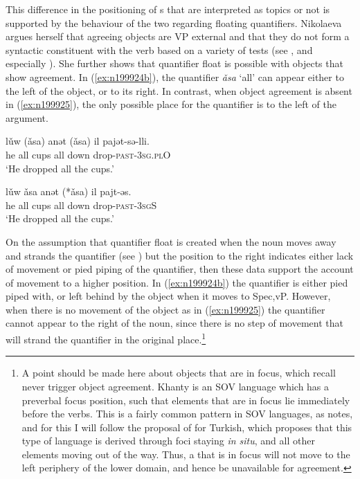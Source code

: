 \documentclass[output=paper
,modfonts
,nonflat]{langsci/langscibook}
\begin{document}
\noindent This difference in the positioning of \theme s that are interpreted as topics or not is supported by the behaviour of the two regarding floating quantifiers. Nikolaeva argues herself that agreeing objects are VP external and that they do not form a syntactic constituent with the verb based on a variety of tests (see \citealt{nikolaeva1999}, and especially \citealt[][67-69]{ostyakgrammar}). She further shows that quantifier float is possible with objects that show agreement. 
In (\ref{ex:n199924b}), the quantifier \emph{\v{a}sa} `all' can appear either to the left of the object, or to its right. In contrast, when object agreement is absent in (\ref{ex:n199925}), the only possible place for the quantifier is to the left of the argument.
\begin{exe}
\ex \citet[][345]{nikolaeva1999}
\begin{xlist}
\ex 
{\gll l\v{u}w (\v{a}sa) anət (\v{a}sa) il pajət-sə-lli.\\
he all cups all down drop-\textsc{past-3sg.plO}\\
\glt `He dropped all the cups.'} \label{ex:n199924b}

\ex 
{\gll l\v{u}w \v{a}sa anət (*\v{a}sa) il pajt-əs.\\
he all cups all down drop-\textsc{past-3sgS}\\
\glt `He dropped all the cups.'} \label{ex:n199925}
\end{xlist}
\end{exe}

\noindent On the assumption that quantifier float is created when the noun moves away and strands the quantifier (see \citealt{sportiche1988,mccloskey2000,boskovic2004b}) but the position to the right indicates either lack of movement or pied piping of the quantifier, then these data support the account of movement to a higher position. 
In (\ref{ex:n199924b}) the quantifier is either pied piped with, or left behind by the object when it moves to Spec,vP. However, when there is no movement of the object as in (\ref{ex:n199925}) the quantifier cannot appear to the right of the noun, since there is no step of movement that will strand the quantifier in the original place.\footnote{A point should be made here about \theme {} objects that are in focus, which recall never trigger object agreement.  Khanty is an SOV language which has a preverbal focus position, such that elements that are in focus lie immediately before the verbs. 
This is a fairly common pattern in SOV languages, as \citet{nikolaeva1999} notes, and for this I will follow the proposal of \citet{sener2010} for Turkish, which \citeauthor{sener2010} proposes that this type of language is derived through foci staying \emph{in situ}, and all other elements moving out of the way.
Thus, a \theme {} that is in focus will not move to the left periphery of the lower domain, and hence be unavailable for agreement.}
\end{document}
